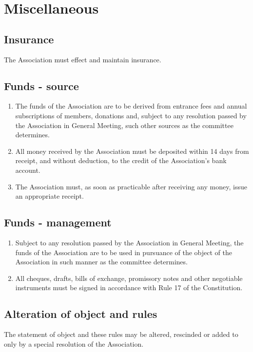 \section{Miscellaneous}

\subsection{Insurance}
The Association must effect and maintain insurance.

\subsection{Funds - source}
\begin{enumerate}
  \item The funds of the Association are to be derived from entrance fees and annual subscriptions of members, donations and, subject to any resolution passed by the Association in General Meeting, such other sources as the committee determines.
  \item All money received by the Association must be deposited within 14 days from receipt, and without deduction, to the credit of the Association’s bank account.
  \item The Association must, as soon as practicable after receiving any money, issue an appropriate receipt.
\end{enumerate}

\subsection{Funds - management}
\begin{enumerate}
  \item Subject to any resolution passed by the Association in General Meeting, the funds of the Association are to be used in pursuance of the object of the Association in such manner as the committee determines.
  \item All cheques, drafts, bills of exchange, promissory notes and other negotiable instruments must be signed in accordance with Rule 17 of the Constitution.
\end{enumerate}

\subsection{Alteration of object and rules}
The statement of object and these rules may be altered, rescinded or added to only by a special resolution of the Association.
